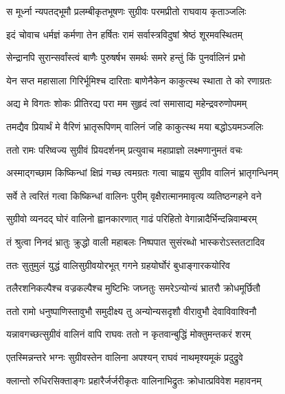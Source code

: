 \twolineshloka
{स मूर्ध्ना न्यपतद्भूमौ प्रलम्बीकृतभूषणः}
{सुग्रीवः परमप्रीतो राघवाय कृताञ्जलिः} %

\twolineshloka
{इदं चोवाच धर्मज्ञं कर्मणा तेन हर्षितः}
{रामं सर्वास्त्रविदुषां श्रेष्ठं शूरमवस्थितम्} %

\twolineshloka
{सेन्द्रानपि सुरान्सर्वांस्त्वं बाणैः पुरुषर्षभ}
{समर्थः समरे हन्तुं किं पुनर्वालिनं प्रभो} %

\twolineshloka
{येन सप्त महासाला गिरिर्भूमिश्च दारिताः}
{बाणेनैकेन काकुत्स्थ स्थाता ते को रणाग्रतः} %

\twolineshloka
{अद्य मे विगतः शोकः प्रीतिरद्य परा मम}
{सुहृदं त्वां समासाद्य महेन्द्रवरुणोपमम्} %

\twolineshloka
{तमद्यैव प्रियार्थं मे वैरिणं भ्रातृरूपिणम्}
{वालिनं जहि काकुत्स्थ मया बद्धोऽयमञ्जलिः} %

\twolineshloka
{ततो रामः परिष्वज्य सुग्रीवं प्रियदर्शनम्}
{प्रत्युवाच महाप्राज्ञो लक्ष्मणानुमतं वचः} %

\twolineshloka
{अस्माद्गच्छाम किष्किन्धां क्षिप्रं गच्छ त्वमग्रतः}
{गत्वा चाह्वय सुग्रीव वालिनं भ्रातृगन्धिनम्} %

\twolineshloka
{सर्वे ते त्वरितं गत्वा किष्किन्धां वालिनः पुरीम्}
{वृक्षैरात्मानमावृत्य व्यतिष्ठन्गहने वने} %

\twolineshloka
{सुग्रीवो व्यनदद् घोरं वालिनो ह्वानकारणात्}
{गाढं परिहितो वेगान्नादैर्भिन्दन्निवाम्बरम्} %

\twolineshloka
{तं श्रुत्वा निनदं भ्रातुः क्रुद्धो वाली महाबलः}
{निष्पपात सुसंरब्धो भास्करोऽस्ततटादिव} %

\twolineshloka
{ततः सुतुमुलं युद्धं वालिसुग्रीवयोरभूत्}
{गगने ग्रहयोर्घोरं बुधाङ्गारकयोरिव} %

\twolineshloka
{तलैरशनिकल्पैश्च वज्रकल्पैश्च मुष्टिभिः}
{जघ्नतुः समरेऽन्योन्यं भ्रातरौ क्रोधमूर्छितौ} %

\twolineshloka
{ततो रामो धनुष्पाणिस्तावुभौ समुदीक्ष्य तु}
{अन्योन्यसदृशौ वीरावुभौ देवाविवाश्विनौ} %

\twolineshloka
{यन्नावगच्छत्सुग्रीवं वालिनं वापि राघवः}
{ततो न कृतवान्बुद्धिं मोक्तुमन्तकरं शरम्} %

\twolineshloka
{एतस्मिन्नन्तरे भग्नः सुग्रीवस्तेन वालिना}
{अपश्यन् राघवं नाथमृश्यमूकं प्रदुद्रुवे} %

\twolineshloka
{क्लान्तो रुधिरसिक्ताङ्गः प्रहारैर्जर्जरीकृतः}
{वालिनाभिद्रुतः क्रोधात्प्रविवेश महावनम्} %

